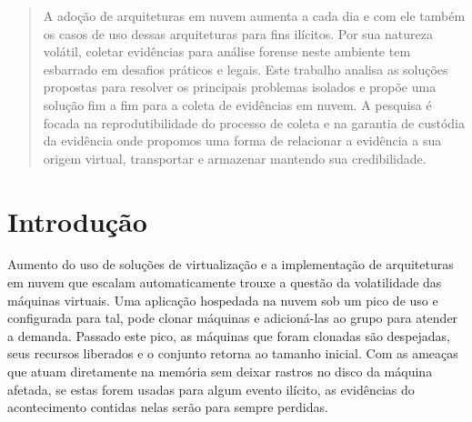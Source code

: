 \documentclass[conference]{IEEEtran}
\begin{document}




\maketitle

\begin{abstract}
A adoção de arquiteturas em nuvem aumenta a cada dia e com ele também os casos de uso dessas arquiteturas para fins ilícitos. Por sua natureza volátil, coletar evidências
para análise forense neste ambiente tem esbarrado em desafios práticos e legais. Este trabalho analisa as soluções propostas para resolver os principais problemas isolados
e propõe uma solução fim a fim para a coleta de evidências em nuvem. A pesquisa é focada na reprodutibilidade do processo de coleta e na garantia de custódia da evidência
onde propomos uma forma de relacionar a evidência a sua origem virtual, transportar e armazenar mantendo sua credibilidade.
\end{abstract}





%
\IEEEpeerreviewmaketitle



\section{Introdução}
Aumento do uso de soluções de virtualização e a implementação de arquiteturas em nuvem que escalam automaticamente \cite{Amazon2016} trouxe a questão da volatilidade 
das máquinas virtuais. Uma aplicação hospedada na nuvem sob um pico de uso e configurada para tal, pode clonar máquinas e adicioná-las ao grupo para atender a demanda. 
Passado este pico, as máquinas que foram clonadas são despejadas, seus recursos liberados e o conjunto retorna ao tamanho inicial. Com as ameaças que atuam diretamente 
na memória sem deixar rastros no disco da máquina afetada, se estas forem usadas para algum evento ilícito, as evidências do acontecimento contidas nelas 
serão para sempre perdidas.
\end{document}
